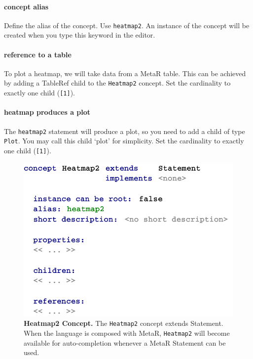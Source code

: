 \paragraph{concept alias}
Define the alias of the concept. Use \texttt{heatmap2}. An instance of the concept will be created when you type this keyword in the editor. 

\paragraph{reference to a table}
To plot a heatmap, we will take data from a MetaR table. This can be achieved by adding a TableRef child to the \texttt{Heatmap2} concept. Set the cardinality to exactly one child (\texttt{[1]}).

\paragraph{heatmap produces a plot}
The \texttt{heatmap2} statement will produce a plot, so you need to add a child of type \texttt{Plot}. You may call this child `plot' for simplicity. Set the cardinality to exactly one child (\texttt{[1]}).



\begin{figure}[htbp]
  \centering
  \includegraphics[width=\figWidthNarrow]{figures/Heatmap2Concept.pdf}
\caption[Heatmap2 Concept.]{\textbf{Heatmap2 Concept.} The \texttt{Heatmap2} concept extends Statement. When the language is composed with MetaR, \texttt{Heatmap2} will become available for auto-completion whenever a MetaR Statement can be used.}
\label{fig:Heatmap2Concept}
\end{figure}


